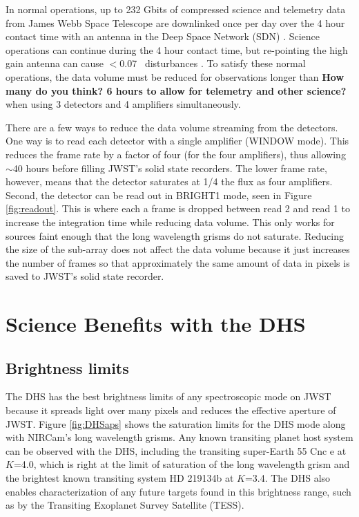 \documentclass{emulateapj}
\begin{document}
In normal operations, up to 232 Gbits of compressed science and telemetry data from James Webb Space Telescope are downlinked once per day over the 4 hour contact time with an antenna in the Deep Space Network (SDN)  \citep{dashevsky2008groundflight}. Science operations can continue during the 4 hour contact time, but re-pointing the high gain antenna can cause $<$0.07 \arcsec\ disturbances \citep{beichman2014pasp}. To satisfy these normal operations, the data volume must be reduced for observations longer than \textbf{How many do you think? 6 hours to allow for telemetry and other science?} when using 3 detectors and 4 amplifiers simultaneously.

There are a few ways to reduce the data volume streaming from the detectors. One way is to read each detector with a single amplifier (WINDOW mode). This reduces the frame rate by a factor of four (for the four amplifiers), thus allowing $\sim$40 hours before filling JWST's solid state recorders. The lower frame rate, however, means that the detector saturates at 1/4 the flux as four amplifiers. Second, the detector can be read out in BRIGHT1 mode, seen in Figure \ref{fig:readout}. This is where each a frame is dropped between read 2 and read 1 to increase the integration time while reducing data volume. This only works for sources faint enough that the long wavelength grisms do not saturate. Reducing the size of the sub-array does not affect the data volume because it just increases the number of frames so that approximately the same amount of data in pixels is saved to JWST's solid state recorder.

\section{Science Benefits with the DHS}\label{sec:addedScience}

\subsection{Brightness limits}\label{sec:brightness}

The DHS has the best brightness limits of any spectroscopic mode on JWST because it spreads light over many pixels and reduces the effective aperture of JWST. Figure \ref{fig:DHSaps} shows the saturation limits for the DHS mode along with NIRCam's long wavelength grisms. Any known transiting planet host system can be observed with the DHS, including the transiting super-Earth  55 Cnc e \citep{mcarthur2004disc55cnce} at $K$=4.0, which is right at the limit of saturation of the long wavelength grism and the brightest known transiting system HD 219134b \citep{motalebi2015hd219134b} at $K$=3.4. The DHS also enables characterization of any future targets found in this brightness range, such as by the Transiting Exoplanet Survey Satellite (TESS).
\end{document}
